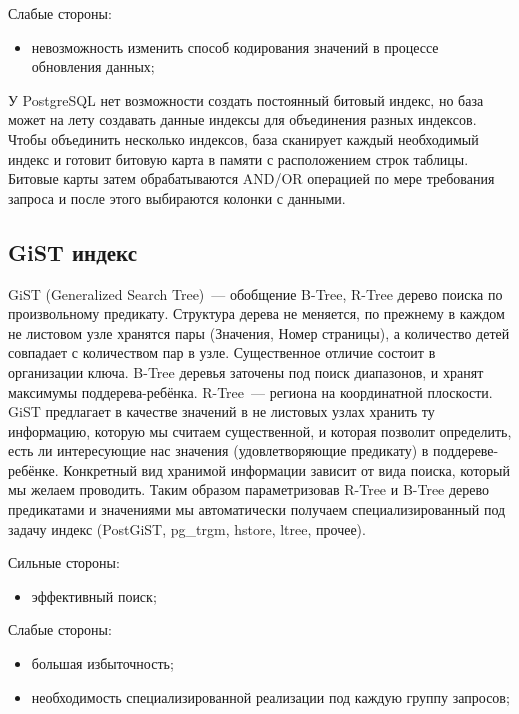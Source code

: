 Слабые стороны:

\begin{itemize}
  \item невозможность изменить способ кодирования значений в процессе обновления данных;
\end{itemize}

У PostgreSQL нет возможности создать постоянный битовый индекс, но база может на лету создавать данные индексы для объединения разных индексов. Чтобы объединить несколько индексов, база сканирует каждый необходимый индекс и готовит битовую карта в памяти с расположением строк таблицы. Битовые карты затем обрабатываются AND/OR операцией по мере требования запроса и после этого выбираются колонки с данными.



\subsection{GiST индекс}

GiST (Generalized Search Tree)~--- обобщение B-Tree, R-Tree дерево поиска по произвольному предикату. Структура дерева не меняется, по прежнему в каждом не листовом узле хранятся пары (Значения, Номер страницы), а количество детей совпадает с количеством пар в узле. Существенное отличие состоит в организации ключа. B-Tree деревья заточены под поиск диапазонов, и хранят максимумы поддерева-ребёнка. R-Tree~--- региона на координатной плоскости. GiST предлагает в качестве значений в не листовых узлах хранить ту информацию, которую мы считаем существенной, и которая позволит определить, есть ли интересующие нас значения (удовлетворяющие предикату) в поддереве-ребёнке. Конкретный вид хранимой информации зависит от вида поиска, который мы желаем проводить. Таким образом параметризовав R-Tree и B-Tree дерево предикатами и значениями мы автоматически получаем специализированный под задачу индекс (PostGiST, pg\_trgm, hstore, ltree, прочее).

Сильные стороны:

\begin{itemize}
  \item эффективный поиск;
\end{itemize}

Слабые стороны:

\begin{itemize}
  \item большая избыточность;
  \item необходимость специализированной реализации под каждую группу запросов;
\end{itemize}

